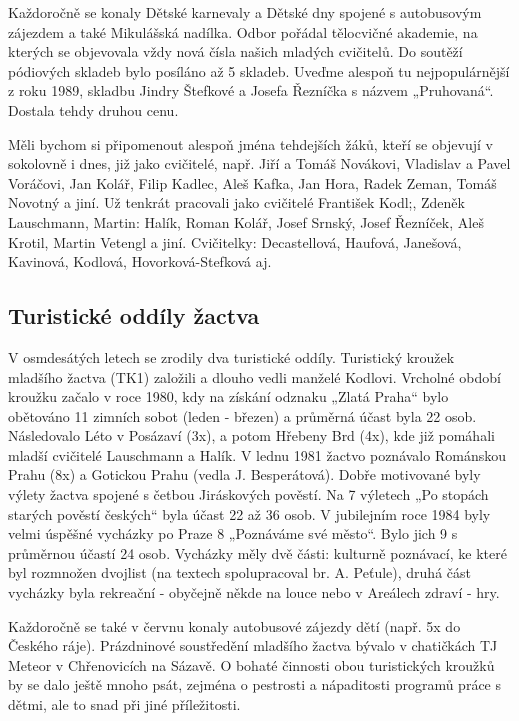 Každoročně se konaly Dětské karnevaly a Dětské dny spojené s autobusovým
zájezdem a také Mikulášská nadílka. Odbor pořádal tělocvičné akademie,
na kterých se objevovala vždy nová čísla našich mladých cvičitelů. Do
soutěží pódiových skladeb bylo posíláno až 5 skladeb. Uveďme alespoň tu
nejpopulárnější z roku 1989, skladbu Jindry Štefkové a Josefa Řezníčka s
názvem „Pruhovaná``. Dostala tehdy druhou cenu.

Měli bychom si připomenout alespoň jména tehdejších žáků, kteří se
objevují v sokolovně i dnes, již jako cvičitelé, např. Jiří a Tomáš
Novákovi, Vladislav a Pavel Voráčovi, Jan Kolář, Filip Kadlec, Aleš
Kafka, Jan Hora, Radek Zeman, Tomáš Novotný a jiní. Už tenkrát pracovali
jako cvičitelé František Kodl;, Zdeněk Lauschmann, Martin: Halík, Roman
Kolář, Josef Srnský, Josef Řezníček, Aleš Krotil, Martin Vetengl a jiní.
Cvičitelky: Decastellová, Haufová, Janešová, Kavinová, Kodlová,
Hovorková-Stefková aj.

\subsection{Turistické oddíly
žactva}\label{turistickuxe9-odduxedly-ux17eactva}

V osmdesátých letech se zrodily dva turistické oddíly. Turistický
kroužek mladšího žactva (TK1) založili a dlouho vedli manželé Kodlovi.
Vrcholné období kroužku začalo v roce 1980, kdy na získání odznaku
„Zlatá Praha`` bylo obětováno 11 zimních sobot (leden - březen) a
průměrná účast byla 22 osob. Následovalo Léto v Posázaví (3x), a potom
Hřebeny Brd (4x), kde již pomáhali mladší cvičitelé Lauschmann a Halík.
V lednu 1981 žactvo poznávalo Románskou Prahu (8x) a Gotickou Prahu
(vedla J. Besperátová). Dobře motivované byly výlety žactva spojené s
četbou Jiráskových pověstí. Na 7 výletech „Po stopách starých pověstí
českých`` byla účast 22 až 36 osob. V jubilejním roce 1984 byly velmi
úspěšné vycházky po Praze 8 „Poznáváme své město``. Bylo jich 9 s
průměrnou účastí 24 osob. Vycházky měly dvě části: kulturně poznávací,
ke které byl rozmnožen dvojlist (na textech spolupracoval br. A.
Peťule), druhá část vycházky byla rekreační - obyčejně někde na louce
nebo v Areálech zdraví - hry.

Každoročně se také v červnu konaly autobusové zájezdy dětí (např. 5x do
Českého ráje). Prázdninové soustředění mladšího žactva bývalo v
chatičkách TJ Meteor v Chřenovicích na Sázavě. O bohaté činnosti obou
turistických kroužků by se dalo ještě mnoho psát, zejména o pestrosti a
nápaditosti programů práce s dětmi, ale to snad při jiné příležitosti.

